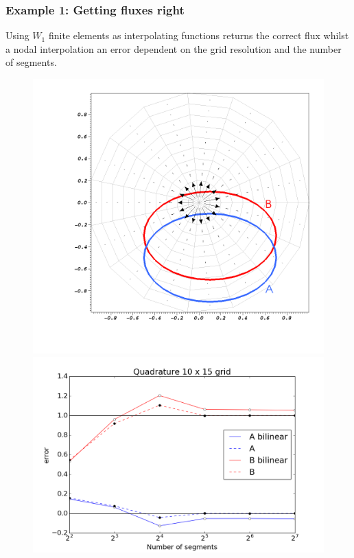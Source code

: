 \documentclass[aspectratio=169]{beamer}
\begin{document}
\begin{frame}[t]
  \frametitle{Example 1: Getting fluxes right}
  \begin{block}{}
   Using $W_1$ finite elements as interpolating functions returns the correct flux whilst a nodal interpolation an error dependent on the grid resolution and the number of segments.
  \end{block}
  
\begin{figure}[!htb]
\centering
\begin{minipage}{.49\textwidth}
  \centering
  \includegraphics[width=.7\linewidth]{polar.png}
\end{minipage}%
\begin{minipage}{.49\textwidth}
  \centering
  \includegraphics[width=.8\linewidth]{case2ErrorPlotAB.png}
\end{minipage}
\end{figure}
\end{frame}
\end{document}
